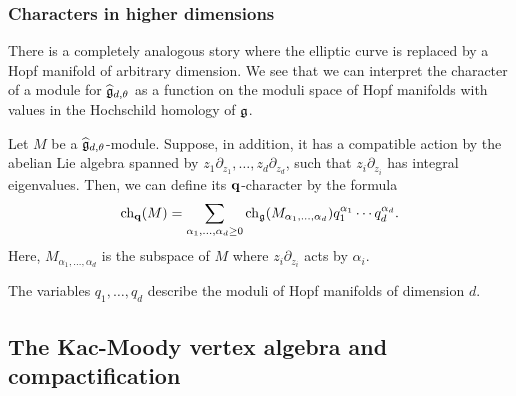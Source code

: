 \subsubsection{Characters in higher dimensions}

There is a completely analogous story where the elliptic curve is replaced by a Hopf manifold of arbitrary dimension. 
We see that we can interpret the character of a module for $\widehat{\mathfrak g}_{d,\theta}$ as a function on the moduli space of Hopf manifolds with values in the Hochschild homology of $\mathfrak g$. 

Let $M$ be a $\widehat{\mathfrak g}_{d,\theta}$-module.
Suppose, in addition, it has a compatible action by the abelian Lie algebra spanned by $z_1 \partial_{z_1},\ldots,z_d \partial_{z_d}$, such that $z_i \partial_{z_i}$ has integral eigenvalues. 
Then, we can define its ${\bf q}$-character by the formula
\[
{\rm ch}_{\bf q}(M) = \sum_{\alpha_1,\ldots,\alpha_d \geq 0} {\rm ch}_{\mathfrak g} (M_{\alpha_1,\ldots,\alpha_d}) q_1^{\alpha_1}\cdots q_d^{\alpha_d} .
\]
Here, $M_{\alpha_1,\ldots,\alpha_d}$ is the subspace of $M$ where $z_i \partial_{z_i}$ acts by $\alpha_i$. 

The variables $q_1,\ldots,q_d$ describe the moduli of Hopf manifolds of dimension $d$. 

\subsection{The Kac-Moody vertex algebra and compactification} 

